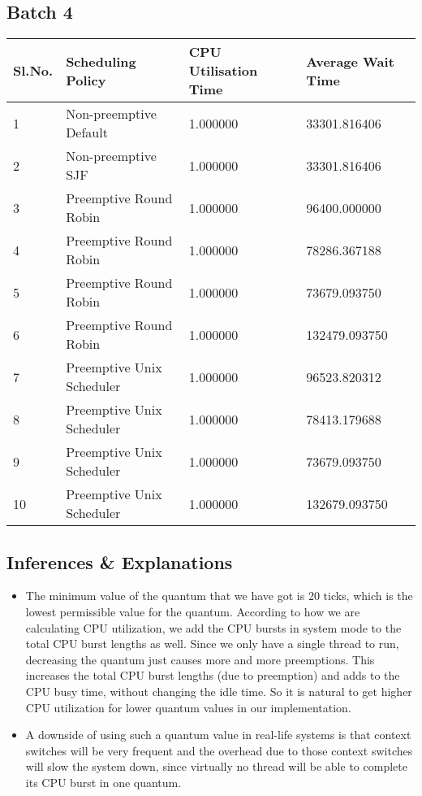 \documentclass{article}
\begin{document}
\subsection{Batch 4}
\begin{center}
    \begin{tabular}{| l | l | l | l |}
    \hline
    Sl.No. & Scheduling Policy & CPU Utilisation Time & Average Wait Time \\ \hline
    1 & Non-preemptive Default & 1.000000 & 33301.816406 \\
    2 & Non-preemptive SJF & 1.000000 & 33301.816406 \\
    3 & Preemptive Round Robin & 1.000000 & 96400.000000 \\
    4 & Preemptive Round Robin & 1.000000 & 78286.367188 \\
    5 & Preemptive Round Robin & 1.000000 & 73679.093750 \\
    6 & Preemptive Round Robin & 1.000000 & 132479.093750 \\
    7 & Preemptive Unix Scheduler & 1.000000 & 96523.820312 \\
    8 & Preemptive Unix Scheduler & 1.000000 & 78413.179688 \\
    9 & Preemptive Unix Scheduler & 1.000000 & 73679.093750 \\
    10 & Preemptive Unix Scheduler & 1.000000 & 132679.093750 \\
    \hline
    \end{tabular}
\end{center}
\subsection{Inferences \& Explanations}
\begin{itemize}
\item The minimum value of the quantum that we have got is 20 ticks, which is the lowest permissible value for the quantum. According to how we are calculating CPU utilization, we add the CPU bursts in system mode to the total CPU burst lengths as well. Since we only have a single thread to run, decreasing the quantum just causes more and more preemptions. This increases the total CPU burst lengths (due to preemption) and adds to the CPU busy time, without changing the idle time. So it is natural to get higher CPU utilization for lower quantum values in our implementation.
\item A downside of using such a quantum value in real-life systems is that context switches will be very frequent and the overhead due to those context switches will slow the system down, since virtually no thread will be able to complete its CPU burst in one quantum.
\end{itemize}
\end{document}

